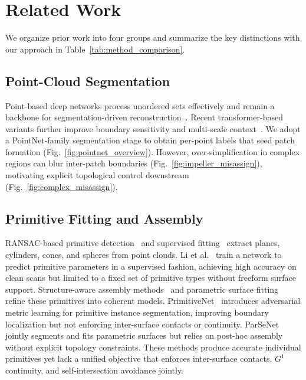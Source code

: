\documentclass{ieeeaccess}
\begin{document}
\section{Related Work}
\label{sec:related}

We organize prior work into four groups and summarize the key
distinctions with our approach in Table~\ref{tab:method_comparison}.

\subsection{Point-Cloud Segmentation}
Point-based deep networks process unordered sets effectively and remain a backbone for segmentation-driven reconstruction~\cite{b7,b8}. Recent transformer-based variants further improve boundary sensitivity and multi-scale context~\cite{b23}. We adopt a PointNet-family segmentation stage to obtain per-point labels that seed patch formation (Fig.~\ref{fig:pointnet_overview}). However, over-simplification in complex regions can blur inter-patch boundaries (Fig.~\ref{fig:impeller_misassign}), motivating explicit topological control downstream (Fig.~\ref{fig:complex_misassign}).

\subsection{Primitive Fitting and Assembly}
RANSAC-based primitive detection~\cite{b15} and supervised fitting~\cite{b27} extract planes, cylinders, cones, and spheres from point clouds. Li et al.~\cite{b27} train a network to predict primitive parameters in a supervised fashion, achieving high accuracy on clean scans but limited to a fixed set of primitive types without freeform surface support. Structure-aware assembly methods~\cite{b14,b19} and parametric surface fitting~\cite{b22} refine these primitives into coherent models. PrimitiveNet~\cite{b28} introduces adversarial metric learning for primitive instance segmentation, improving boundary localization but not enforcing inter-surface contacts or continuity. ParSeNet~\cite{b19} jointly segments and fits parametric surfaces but relies on post-hoc assembly without explicit topology constraints. These methods produce accurate individual primitives yet lack a unified objective that enforces inter-surface contacts, $G^1$ continuity, and self-intersection avoidance jointly.
\end{document}
